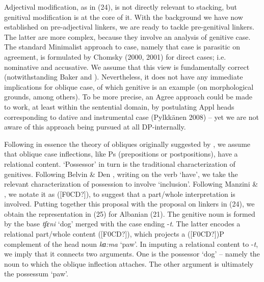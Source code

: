 \documentclass[output=paper]{langsci/langscibook}
\begin{document}
\begin{styleSfondomedioiColorexi}
  Adjectival modification, as in (24), is not directly relevant to stacking, but genitival modification is at the core of it. With the background we have now established on pre-adjectival linkers, we are ready to tackle pre-genitival linkers. The latter are more complex, because they involve an analysis of genitive case. The standard Minimalist approach to case, namely that case is parasitic on agreement, is formulated by Chomsky (2000, 2001) for direct cases; i.e. nominative and accusative. We assume that this view is fundamentally correct (notwithstanding Baker and \citealt{Vinokurova2010}). Nevertheless, it does not have any immediate implications for oblique case, of which genitive is an example (on morphological grounds, among others). To be more precise, an Agree approach could be made to work, at least within the sentential domain, by postulating Appl heads corresponding to dative and instrumental case (Pylkkänen 2008) – yet we are not aware of this approach being pursued at all DP-internally.
\end{styleSfondomedioiColorexi}

\begin{styleSfondomedioiColorexi}
  Following in essence the theory of obliques originally suggested by \citet{Fillmore1968}, we assume that oblique case inflections, like Ps (prepositions or postpositions), have a relational content. ‘Possessor’ in turn is the traditional characterization of genitives. Following Belvin \& Den \citet{Dikken1997}, writing on the verb ‘have’, we take the relevant characterization of possession to involve ‘inclusion’. Following Manzini \& \citet{Savoia2011b}, we notate it as ([F0CD?]), to suggest that a part/whole interpretation is involved. Putting together this proposal with the proposal on linkers in (24), we obtain the representation in (25) for Albanian (21). The genitive noun is formed by the base \textit{tʃ}\textit{ɛni} ‘dog’ merged with the case ending -\textit{t}. The latter encodes a relational part/whole content ([F0CD?]), which projects a ([F0CD?])P complement of the head noun \textit{kɑ:ma} ‘paw’. In imputing a relational content to -\textit{t}, we imply that it connects two arguments. One is the possessor ‘dog’ – namely the noun to which the oblique inflection attaches. The other argument is ultimately the possessum ‘paw’. 
\end{styleSfondomedioiColorexi}

\begin{styleGrigliamediaiiColorexi}
\ea%
    \label{ex:key:25}
    \gll\\
        \\
    \glt
    \z

                       
\end{styleGrigliamediaiiColorexi}
\end{document}
